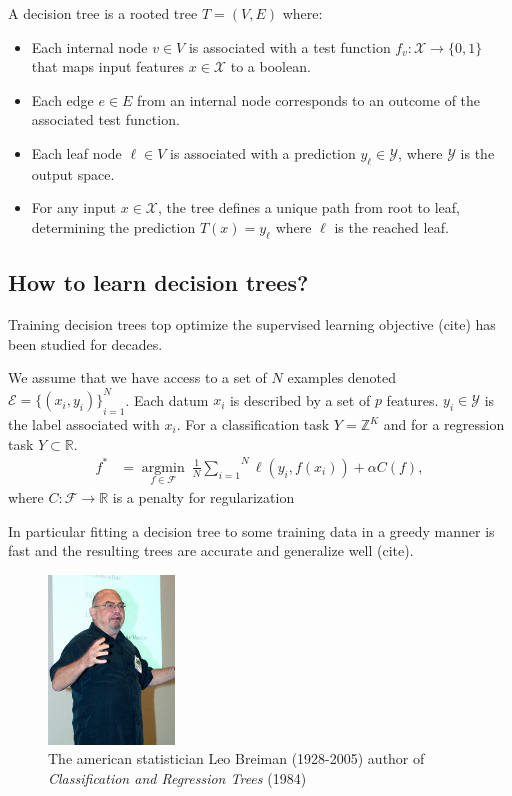 \begin{definition}
A decision tree is a rooted tree $T = (V, E)$ where:
\begin{itemize}
\item Each internal node $v \in V$ is associated with a test function $f_v: \mathcal{X} \rightarrow \{0, 1\}$ that maps input features $x \in \mathcal{X}$ to a boolean.
\item Each edge $e \in E$ from an internal node corresponds to an outcome of the associated test function.
\item Each leaf node $\ell \in V$ is associated with a prediction $y_\ell \in \mathcal{Y}$, where $\mathcal{Y}$ is the output space.
\item For any input $x \in \mathcal{X}$, the tree defines a unique path from root to leaf, determining the prediction $T(x) = y_\ell$ where $\ell$ is the reached leaf.
\end{itemize}
\end{definition}
\subsection{How to learn decision trees?}
Training decision trees top optimize the supervised learning objective (cite) has been studied for decades.

\begin{definition}
We assume that we have access to a set of $N$ examples denoted $\mathcal{E} = {\{(x_i, y_i)\}}_{i=1}^N$. Each datum $x_i$ is described by a set of $p$ features. $y_i \in {\mathcal Y}$ is the label associated with $x_i$.
For a classification task $Y=\mathbb{Z}^K$ and for a regression task $Y\subset \mathbb{R}$.
\begin{align}
    f^* &= \underset{f \in \mathcal{F}}{\operatorname{argmin}}\ \frac{1}{N}\overset{N}{\underset{i=1}{\sum}}{\ell}(y_i, f(x_i)) + \alpha C(f),
    \label{eq:suplearning}
\end{align}
where $C: \mathcal{F} \rightarrow \mathbb{R}$ is a penalty for regularization
\end{definition}
In particular fitting a decision tree to some training data in a greedy manner is fast and the resulting trees are accurate and generalize well (cite).

\begin{figure}
    \centering
    \includegraphics[width=0.3\textwidth]{images/images_intro/Leo_Breiman.jpg}
    \caption{The american statistician Leo Breiman (1928-2005) author of \textit{Classification and Regression Trees} (1984)}
    \label{fig:leo-breiman}
\end{figure}

